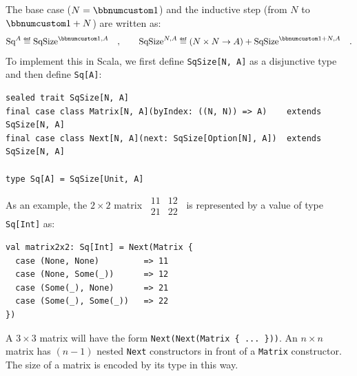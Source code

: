 The base case ($N=\bbnum 1$) and the inductive step (from $N$ to
$\bbnum 1+N$) are written as:
\[
\text{Sq}^{A}\triangleq\text{SqSize}^{\bbnum 1,A}\quad,\quad\quad\text{SqSize}^{N,A}\triangleq\left(N\times N\rightarrow A\right)+\text{SqSize}^{\bbnum 1+N,A}\quad.
\]
To implement this in Scala, we first define \lstinline!SqSize[N, A]!
as a disjunctive type and then define \lstinline!Sq[A]!:
\begin{lstlisting}
sealed trait SqSize[N, A]
final case class Matrix[N, A](byIndex: ((N, N)) => A)    extends SqSize[N, A]
final case class Next[N, A](next: SqSize[Option[N], A])  extends SqSize[N, A]

type Sq[A] = SqSize[Unit, A]
\end{lstlisting}

As an example, the $2\times2$ matrix $\,\begin{array}{|cc|}
11 & 12\\
21 & 22
\end{array}\,$ is represented by a value of type \lstinline!Sq[Int]! as:\vspace{0.2\baselineskip}

\begin{lstlisting}
val matrix2x2: Sq[Int] = Next(Matrix {
  case (None, None)         => 11
  case (None, Some(_))      => 12
  case (Some(_), None)      => 21
  case (Some(_), Some(_))   => 22
})
\end{lstlisting}

A $3\times3$ matrix will have the form \lstinline!Next(Next(Matrix { ... }))!.
An $n\times n$ matrix has $\left(n-1\right)$ nested \lstinline!Next!
constructors in front of a \lstinline!Matrix! constructor. The size
of a matrix is encoded by its type in this way.

